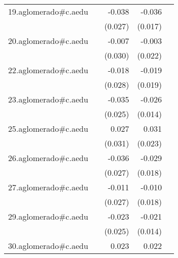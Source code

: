 {\begin{longtable}{l*{4}{D{.}{.}{-1}}}
\addlinespace
19.aglomerado#c.aedu&                     &      -0.038         &      -0.036\sym{*}  &                     \\
            &                     &     (0.027)         &     (0.017)         &                     \\
\addlinespace
20.aglomerado#c.aedu&                     &      -0.007         &      -0.003         &                     \\
            &                     &     (0.030)         &     (0.022)         &                     \\
\addlinespace
22.aglomerado#c.aedu&                     &      -0.018         &      -0.019         &                     \\
            &                     &     (0.028)         &     (0.019)         &                     \\
\addlinespace
23.aglomerado#c.aedu&                     &      -0.035         &      -0.026         &                     \\
            &                     &     (0.025)         &     (0.014)         &                     \\
\addlinespace
25.aglomerado#c.aedu&                     &       0.027         &       0.031         &                     \\
            &                     &     (0.031)         &     (0.023)         &                     \\
\addlinespace
26.aglomerado#c.aedu&                     &      -0.036         &      -0.029         &                     \\
            &                     &     (0.027)         &     (0.018)         &                     \\
\addlinespace
27.aglomerado#c.aedu&                     &      -0.011         &      -0.010         &                     \\
            &                     &     (0.027)         &     (0.018)         &                     \\
\addlinespace
29.aglomerado#c.aedu&                     &      -0.023         &      -0.021         &                     \\
            &                     &     (0.025)         &     (0.014)         &                     \\
\addlinespace
30.aglomerado#c.aedu&                     &       0.023         &       0.022         &                     \\

\end{longtable}}
